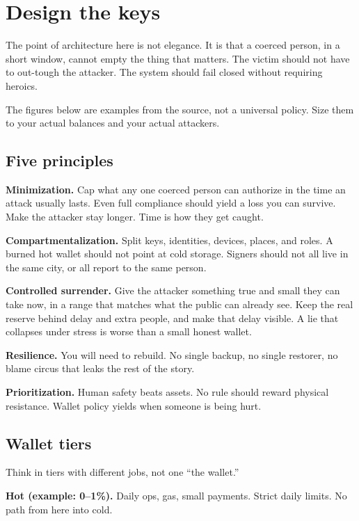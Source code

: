 \chapter{Design the keys}

The point of architecture here is not elegance. It is
that a coerced person, in a short window, cannot empty
the thing that matters. The victim should not have to
out-tough the attacker. The system should fail closed
without requiring heroics.

The figures below are examples from the source, not a
universal policy. Size them to your actual balances and
your actual attackers.

\section{Five principles}

\textbf{Minimization.} Cap what any one coerced person
can authorize in the time an attack usually lasts. Even
full compliance should yield a loss you can survive.
Make the attacker stay longer. Time is how they get
caught.

\textbf{Compartmentalization.} Split keys, identities,
devices, places, and roles. A burned hot wallet should
not point at cold storage. Signers should not all live
in the same city, or all report to the same person.

\textbf{Controlled surrender.} Give the attacker
something true and small they can take now, in a range
that matches what the public can already see. Keep the
real reserve behind delay and extra people, and make
that delay visible. A lie that collapses under stress is
worse than a small honest wallet.

\textbf{Resilience.} You will need to rebuild. No single
backup, no single restorer, no blame circus that leaks
the rest of the story.

\textbf{Prioritization.} Human safety beats assets. No
rule should reward physical resistance. Wallet policy
yields when someone is being hurt.

\section{Wallet tiers}

Think in tiers with different jobs, not one ``the
wallet.''

\textbf{Hot (example: 0--1\%).} Daily ops, gas, small
payments. Strict daily limits. No path from here into
cold.

